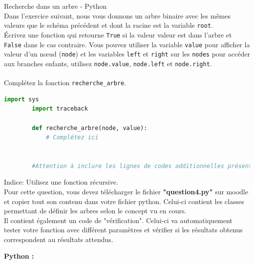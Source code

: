     \begin{Exercice}[15 minutes] Recherche dans un arbre - Python\\
        
        Dans l'exercice suivant, nous vous donnons un arbre binaire avec les mêmes valeurs que le schéma précédent et dont la racine est la variable \lstinline{root}.\\
    
        Écrivez une fonction qui retourne \lstinline{True} si la valeur valeur est dans l'arbre et \lstinline{False} dans le cas contraire. Vous pouvez utiliser la variable \lstinline{value} pour afficher la valeur d'un nœud (\lstinline{node}) et les variables \lstinline{left} et \lstinline{right} sur les \lstinline{nodes} pour accéder aux branches enfants, utilisez \lstinline{node.value}, \lstinline{node.left} et \lstinline{node.right}.\\\\
        Complétez la fonction \lstinline{recherche_arbre}.\\
        \begin{lstlisting}[language=Python]
        import sys
        import traceback
    
        def recherche_arbre(node, value):
            # Complétez ici
            
            
        #Attention à inclure les lignes de codes additionnelles présentes dans le fichier "question4.py" sur Moodle
        \end{lstlisting}
    
        \begin{conseil}
        Indice: Utilisez une fonction récursive.\\
        
        Pour cette question, vous devez télécharger le fichier \textbf{"question4.py"} sur moodle et copier tout son contenu dans votre fichier python. Celui-ci contient les classes permettant de définir les arbres selon le concept vu en cours. \\
        
        Il contient également un code de "vérification". Celui-ci va automatiquement tester votre fonction avec différent paramètres et vérifier si les résultats obtenus correspondent au résultats attendus.
        \end{conseil}
    
        \begin{solution}
            \textbf{Python :}
            
        \end{solution}
    
    \end{Exercice}
    
    
